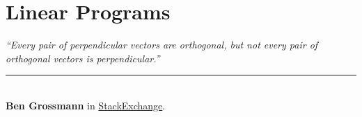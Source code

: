 \chapter{Linear Programs}\label{p04-chp:linprog}


\begin{flushright}
\textit{``Every pair of perpendicular vectors are orthogonal, but not every pair of orthogonal vectors is perpendicular.''}\\
\rule{0.5\textwidth}{.4pt}\\
\textbf{Ben Grossmann} \small{in \href{https://math.stackexchange.com/questions/2326896/about-perpendicular-vectors}{StackExchange}.}
\end{flushright}
